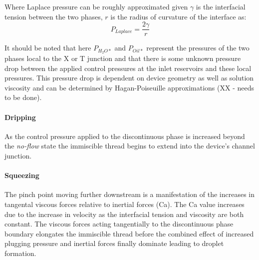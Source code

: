 Where Laplace pressure can be roughly approximated given $\gamma$ is the interfacial tension between the two phases, $r$ is the radius of curvature of the interface as:
\begin{equation}
 P_{Laplace} = \frac{2 \gamma}{r}
\label{eq:laplace}
\end{equation}

It should be noted that here $P_{H_2O*}$ and $P_{Oil*}$ represent the pressures of the two phases local to the X or T junction and that there is some unknown pressure drop between the applied control pressures at the inlet reservoirs and these local pressures. This pressure drop is dependent on device geometry as well as solution viscosity and can be determined by Hagan-Poiseuille approximations (XX - needs to be done). 
 
\paragraph{Dripping}

As the control pressure applied to the discontinuous phase is increased beyond the \emph{no-flow} state the immiscible thread begins to extend into the device's channel junction. 


\paragraph{Squeezing}

The pinch point moving further downstream is a manifestation of the increases in tangental viscous forces relative to inertial forces (Ca). The Ca value increases due to the increase in velocity as the interfacial tension and viscosity are both constant. The viscous forces acting tangentially to the discontinuous phase boundary elongates the immiscible thread before the combined effect of increased plugging pressure and inertial forces finally dominate leading to droplet formation.

